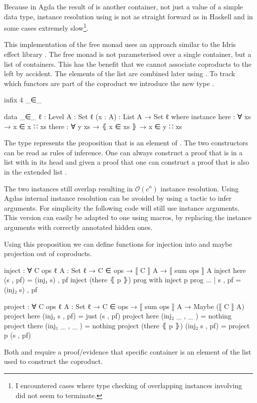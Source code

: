 Because in Agda the result of  is another container, not
just a value of a simple data type, instance resolution using
 is not as straight forward as in Haskell and in some cases
extremely slow\footnote{I encountered cases where type checking of overlapping
instances involving  did not seem to terminate.}.

This implementation of the free monad uses an approach similar to the Idris
effect library \cite{DBLP:conf/icfp/Brady13}.
The free monad is not parameterised over a single container, but a list
 of containers.
This has the benefit that we cannot associate coproducts to the left by
accident.
The elements of the list are combined later using .
To track which functors are part of the coproduct we introduce the new type
.

\begin{code}[hide]
infix 4 _∈_
\end{code}
\begin{code}
data _∈_ {ℓ : Level} {A : Set ℓ} (x : A) : List A → Set ℓ where
  instance
    here : ∀ {xs} → x ∈ x ∷ xs
    there : ∀ {y xs} → ⦃ x ∈ xs ⦄ → x ∈ y ∷ xs
\end{code}
The type
\AgdaSpace{}\AgdaSpace{}
represents the proposition that  is an element of
.
The two constructors can be read as rules of inference.
One can always construct a proof that  is in a list with
 in its head and given a proof that
\AgdaSpace{}\AgdaSpace{}
one can construct a proof that  is also in the extended list
\AgdaSpace{}\AgdaSpace{}.

The two instances still overlap resulting in $\mathcal{O}(c^n)$ instance
resolution.
Using Agdas internal instance resolution can be avoided by using a tactic to
infer  arguments.
For simplicity the following code will still use instance arguments.
This version can easily be adapted to one using macros, by replacing the
instance arguments with correctly annotated hidden ones.

Using this proposition we can define functions for injection into and maybe projection
out of coproducts.

\begin{code}
inject : ∀ {C ops ℓ} {A : Set ℓ} → C ∈ ops → ⟦ C ⟧ A → ⟦ sum ops ⟧ A
inject here           (s , pf)  = (inj₁ s) , pf
inject (there ⦃ p ⦄)  prog      with inject p prog
... | s , pf = (inj₂ s) , pf

project : ∀ {C ops ℓ} {A : Set ℓ} → C ∈ ops → ⟦ sum ops ⟧ A → Maybe (⟦ C ⟧ A)
project here           (inj₁ s , pf)  = just (s , pf)
project here           (inj₂ _ , _ )  = nothing
project there          (inj₁ _ , _ )  = nothing
project (there ⦃ p ⦄)  (inj₂ s , pf)  = project p (s , pf)
\end{code}
Both  and  require a proof/evidence
that specific container is an element of the list used to construct the
coproduct.

